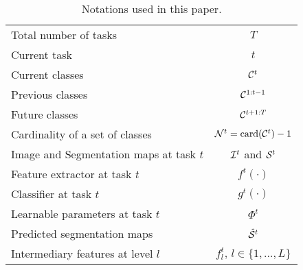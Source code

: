 \begin{table}[t]
    \centering
    \begin{tabular}{@{}l|c@{}}
        \toprule
        Total number of tasks                   & $T$                                      \\
        Current task                            & $t$                                      \\
        Current classes                         & $\mathcal{C}^t$                                 \\
        Previous classes                        & $\mathcal{C}^{1:t-1}$                           \\
        Future classes                          & $\mathcal{C}^{t+1:T}$                           \\
        Cardinality of a set of classes         & $\mathcal{N}^t=\operatorname{card}(\mathcal{C}^{t})-1$ \\
        Image and Segmentation maps at task $t$ & $\mathcal{I}^t$ and $\mathcal{S}^t$                    \\
        Feature extractor at task $t$           & $f^t(\cdot)$                             \\
        Classifier at task $t$                  & $g^t(\cdot)$                             \\
        Learnable parameters at task $t$        & $\Phi^t$                                 \\
        Predicted segmentation maps             & $\hat{\mathcal{S}}^t$                           \\
        Intermediary features at level $l$      & $f^t_l,\,l \in \{1, \dots, L\}$          \\
        \bottomrule
    \end{tabular}
    \caption{Notations used in this paper.}
    \label{tab:seg_notation}
\end{table}
